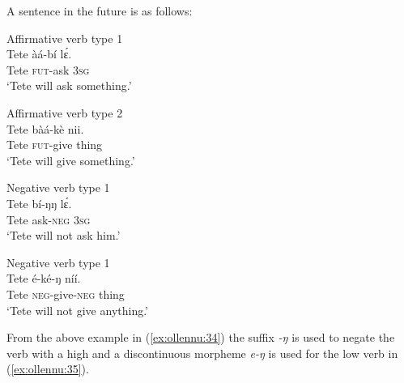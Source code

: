 \documentclass[output=paper
,newtxmath
,modfonts
,nonflat]{langsci/langscibook}
\begin{document}
A sentence in the future is as follows:\\
\begin{minipage}{.5\textwidth}

\ea Affirmative verb type 1 \label{ex:ollennu:32}\\
\gll Tete \`a\'a-b\'i l\'ɛ.\\
Tete \textsc{fut}-ask 3\textsc{sg} \\
\glt `Tete will ask something.'
\z
\end{minipage}
\begin{minipage}{.5\textwidth}

\ea Affirmative verb type 2
\label{ex:ollennu:33}\\
\gll Tete b\`a\'a-k\`e nii.\\
Tete \textsc{fut}-give thing\\
\glt `Tete will give something.'\\
\z
\end{minipage}
\-\vspace{1em}\-
\begin{minipage}{.5\textwidth}
\ea Negative verb type 1 \\ \label{ex:ollennu:34}
\gll Tete b\'i-ŋŋ l\'ɛ.\\
Tete ask-\textsc{neg} 3\textsc{sg}\\
\glt `Tete will not ask him.'
\z
\end{minipage}
\begin{minipage}{.5\textwidth}
\ea Negative verb type 1 \\ \label{ex:ollennu:35}
\gll Tete \'e-k\'e-ŋ n\'i\'i.\\
Tete \textsc{neg}-give-\textsc{neg} thing\\
\glt `Tete will not give anything.'\\
\z
\end{minipage}
From the above example in (\ref{ex:ollennu:34}) the suffix \textit{-ŋ} is used to negate the verb with a high  and a discontinuous morpheme \textit{e-ŋ} is used for the low  verb in (\ref{ex:ollennu:35}).
\end{document}
